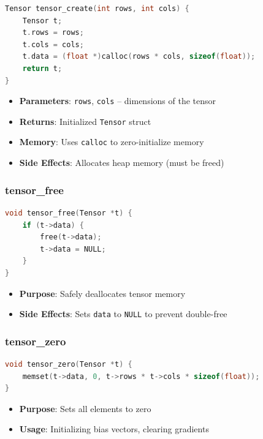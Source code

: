 \documentclass[11pt,a4paper]{article}
\begin{document}
\begin{lstlisting}[language=C, caption={Tensor creation function}]
Tensor tensor_create(int rows, int cols) {
    Tensor t;
    t.rows = rows;
    t.cols = cols;
    t.data = (float *)calloc(rows * cols, sizeof(float));
    return t;
}
\end{lstlisting}

\begin{itemize}
    \item \textbf{Parameters}: \texttt{rows}, \texttt{cols} -- dimensions of the tensor
    \item \textbf{Returns}: Initialized \texttt{Tensor} struct
    \item \textbf{Memory}: Uses \texttt{calloc} to zero-initialize memory
    \item \textbf{Side Effects}: Allocates heap memory (must be freed)
\end{itemize}

\subsubsection{tensor\_free}

\begin{lstlisting}[language=C, caption={Tensor deallocation}]
void tensor_free(Tensor *t) {
    if (t->data) {
        free(t->data);
        t->data = NULL;
    }
}
\end{lstlisting}

\begin{itemize}
    \item \textbf{Purpose}: Safely deallocates tensor memory
    \item \textbf{Side Effects}: Sets \texttt{data} to \texttt{NULL} to prevent double-free
\end{itemize}

\subsubsection{tensor\_zero}

\begin{lstlisting}[language=C, caption={Zero-fill tensor}]
void tensor_zero(Tensor *t) {
    memset(t->data, 0, t->rows * t->cols * sizeof(float));
}
\end{lstlisting}

\begin{itemize}
    \item \textbf{Purpose}: Sets all elements to zero
    \item \textbf{Usage}: Initializing bias vectors, clearing gradients
\end{itemize}
\end{document}
